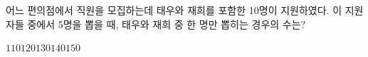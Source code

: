 \hspace*{2mm}\begin{minipage}[t]{\dimexpr\linewidth-2mm\relax}\vspace{0pt}
어느 편의점에서 직원을 모집하는데 태우와 재희를 포함한 10명이 지원하였다. 이 지원자들 중에서 5명을 뽑을 때, 태우와 재희 중 한 명만 뽑히는 경우의 수는?
\begin{choices32}{$110$}{$120$}{$130$}{$140$}{$150$}\end{choices32}\end{minipage}
